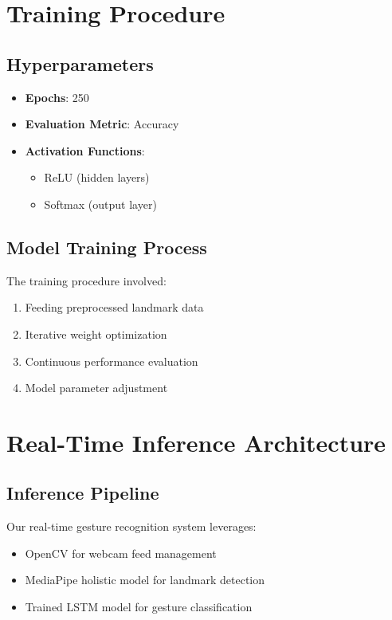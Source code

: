 \section{Training Procedure}

\subsection{Hyperparameters}
\begin{itemize}
\item \textbf{\textbf{Epochs}}: 250
\item \textbf{\textbf{Evaluation Metric}}: Accuracy
\item \textbf{\textbf{Activation Functions}}:
\begin{itemize}
\item ReLU (hidden layers)
\item Softmax (output layer)
\end{itemize}
\end{itemize}

\subsection{Model Training Process}
The training procedure involved:
\begin{enumerate}
\item Feeding preprocessed landmark data
\item Iterative weight optimization
\item Continuous performance evaluation
\item Model parameter adjustment
\end{enumerate}

\section{Real-Time Inference Architecture}

\subsection{Inference Pipeline}
Our real-time gesture recognition system leverages:
\begin{itemize}
\item OpenCV for webcam feed management
\item MediaPipe holistic model for landmark detection
\item Trained LSTM model for gesture classification
\end{itemize}

